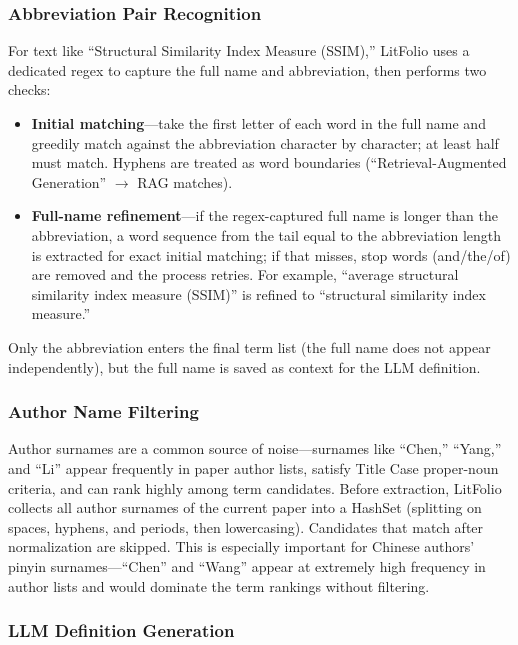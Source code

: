 \subsubsection{Abbreviation Pair Recognition}

For text like ``Structural Similarity Index Measure (SSIM),'' LitFolio uses a dedicated
regex to capture the full name and abbreviation, then performs two checks:

\begin{itemize}
  \item \textbf{Initial matching}---take the first letter of each word in the full name
    and greedily match against the abbreviation character by character; at least half
    must match. Hyphens are treated as word boundaries (``Retrieval-Augmented
    Generation'' $\to$ RAG matches).
  \item \textbf{Full-name refinement}---if the regex-captured full name is longer than
    the abbreviation, a word sequence from the tail equal to the abbreviation length
    is extracted for exact initial matching; if that misses, stop words (and/the/of)
    are removed and the process retries. For example, ``average structural similarity
    index measure (SSIM)'' is refined to ``structural similarity index measure.''
\end{itemize}

Only the abbreviation enters the final term list (the full name does not appear
independently), but the full name is saved as context for the LLM definition.

\subsubsection{Author Name Filtering}

Author surnames are a common source of noise---surnames like ``Chen,''
``Yang,'' and ``Li'' appear frequently in paper author lists, satisfy Title Case
proper-noun criteria, and can rank highly among term candidates. Before extraction,
LitFolio collects all author surnames of the current paper into a HashSet (splitting
on spaces, hyphens, and periods, then lowercasing). Candidates that match after
normalization are skipped. This is especially important for Chinese authors' pinyin
surnames---``Chen'' and ``Wang'' appear at extremely high frequency in author lists
and would dominate the term rankings without filtering.

\subsubsection{LLM Definition Generation}

